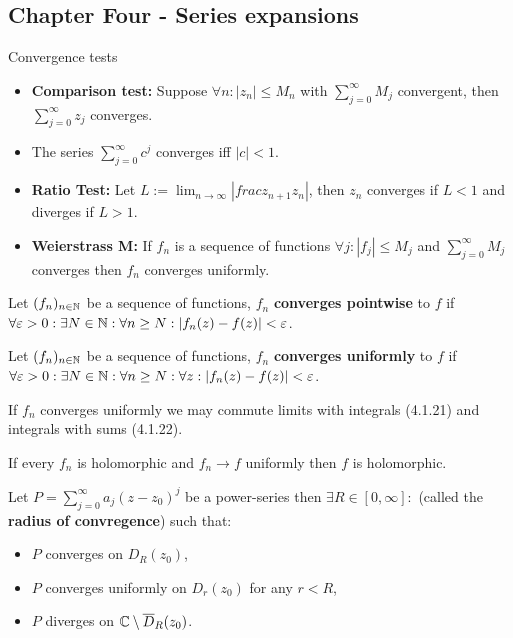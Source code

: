 \newpage%
\begin{multicols}{2}
\section*{Chapter Four - Series expansions}

\begin{theorem}
Convergence tests
\begin{itemize}
    \item{\textbf{Comparison test:} Suppose $\forall n: |z_n|\leq M_n$ with $\sum_{j=0}^\infty M_j$ convergent, then $\sum_{j=0}^\infty z_j$ converges.}
    \item{The series $\sum_{j=0}^\infty c^j$ converges iff $|c|<1$.}
    \item{\textbf{Ratio Test:} Let $L:=\lim_{n\to\infty}\left|frac{z_{n+1}}{z_n}\right|$, then $z_n$ converges if $L<1$ and diverges if $L>1$.}
    \item{\textbf{Weierstrass M:} If $f_n$ is a sequence of functions $\forall j:|f_j|\leq M_j$ and $\sum_{j=0}^\infty M_j$ converges then $f_n$ converges uniformly.}
\end{itemize}
\end{theorem}

\begin{definition}
Let $(f_n)_{n\in\mathbb{N}}$ be a sequence of functions, $f_n$ \textbf{converges pointwise} to $f$ if $\forall\varepsilon>0:\exists N\in\mathbb{N}:\forall n\geq N: |f_n(z)-f(z)|<\varepsilon$.
\end{definition}

\begin{definition}
Let $(f_n)_{n\in\mathbb{N}}$ be a sequence of functions, $f_n$ \textbf{converges uniformly} to $f$ if $\forall\varepsilon>0:\exists N\in\mathbb{N}:\forall n\geq N:\forall z: |f_n(z)-f(z)|<\varepsilon$.
\end{definition}

\begin{theorem}[4.1.21,4.1.22]
If $f_n$ converges uniformly we may commute limits with integrals (4.1.21) and integrals with sums (4.1.22).
\end{theorem}

\begin{theorem}[4.1.23]
If every $f_n$ is holomorphic and $f_n\to f$ uniformly then $f$ is holomorphic.
\end{theorem}

\begin{theorem}[4.2.2]
Let $P = \sum_{j=0}^\infty a_j(z-z_0)^j$ be a power-series then $\exists R\in[0,\infty]:$ (called the \textbf{radius of convregence}) such that:
\begin{itemize}
    \item{$P$ converges on $D_R(z_0)$,}
    \item{$P$ converges uniformly on $D_r(z_0)$ for any $r<R$,}
    \item{$P$ diverges on $\mathbb{C}\setminus\overline{D}_R(z_0)$.}
\end{itemize}
\end{theorem}


\end{multicols}
